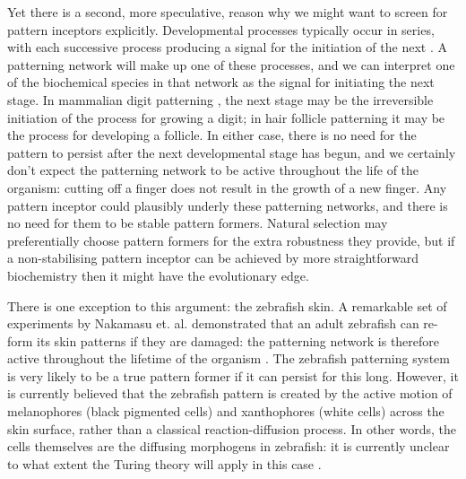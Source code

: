 Yet there is a second, more speculative, reason why we might want to screen for pattern inceptors explicitly. Developmental processes typically occur in series, with each successive process producing a signal for the initiation of the next \cite{corson2012geometry}. A patterning network will make up one of these processes, and we can interpret one of the biochemical species in that network as the signal for initiating the next stage. In mammalian digit patterning \cite{sheth2012hox}, the next stage may be the irreversible initiation of the process for growing a digit; in hair follicle patterning \cite{sick2006wnt} it may be the process for developing a follicle. In either case, there is no need for the pattern to persist after the next developmental stage has begun, and we certainly don't expect the patterning network to be active throughout the life of the organism: cutting off a finger does not result in the growth of a new finger. Any pattern inceptor could plausibly underly these patterning networks, and there is no need for them to be stable pattern formers. Natural selection may preferentially choose pattern formers for the extra robustness they provide, but if a non-stabilising pattern inceptor can be achieved by more straightforward biochemistry then it might have the evolutionary edge.

There is one exception to this argument: the zebrafish skin. A remarkable set of experiments by Nakamasu et. al. demonstrated that an adult zebrafish can re-form its skin patterns if they are damaged: the patterning network is therefore active throughout the lifetime of the organism \cite{nakamasu2009interactions}. The zebrafish patterning system is very likely to be a true pattern former if it can persist for this long. However, it is currently believed that the zebrafish pattern is created by the active motion of melanophores (black pigmented cells) and xanthophores (white cells) across the skin surface, rather than a classical reaction-diffusion process. In other words, the cells themselves are the diffusing morphogens in zebrafish: it is currently unclear to what extent the Turing theory will apply in this case \cite{marcon2012turing}.

